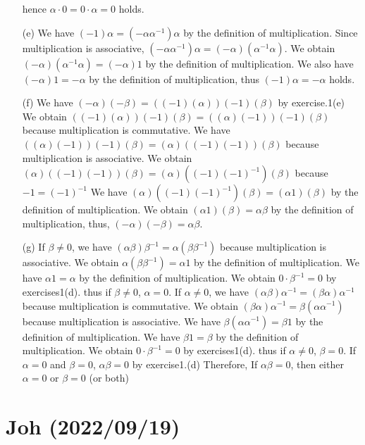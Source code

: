 \documentclass{article}
\begin{document}
\begin{itemize}
    hence $\alpha\cdot0 = 0\cdot\alpha = 0$ holds.
  \item[(e)]We have $(-1)\alpha = (-\alpha\alpha^{-1})\alpha$ by the definition of multiplication.
    Since multiplication is associative, $(-\alpha\alpha^{-1})\alpha = (-\alpha)(\alpha^{-1}\alpha)$.
    We obtain $(-\alpha)(\alpha^{-1}\alpha) = (-\alpha)1$ by the definition of multiplication.
    We also have $(-\alpha)1 = -\alpha$ by the definition of multiplication, 
    thus $(-1)\alpha = -\alpha$ holds.
  \item[(f)]We have $(-\alpha)(-\beta) = ((-1)(\alpha))(-1)(\beta)$ by exercise.1(e)
    We obtain $((-1)(\alpha))(-1)(\beta) = ((\alpha)(-1))(-1)(\beta)$ because multiplication is commutative.
    We have $((\alpha)(-1))(-1)(\beta) = (\alpha)((-1)(-1))(\beta)$ because multiplication is associative.
    We obtain $(\alpha)((-1)(-1))(\beta) = (\alpha)((-1)(-1)^{-1})(\beta)$ because $-1 = (-1)^{-1}$
    We have $(\alpha)((-1)(-1)^{-1})(\beta) = (\alpha1)(\beta)$ by the definition of multiplication.
    We obtain $(\alpha1)(\beta) = \alpha\beta$ by the definition of multiplication,
    thus, $(-\alpha)(-\beta) = \alpha\beta$.
  \item[(g)]If $\beta \neq 0$, we have $(\alpha\beta)\beta^{-1}=\alpha(\beta\beta^{-1})$ because multiplication is associative.
    We obtain $\alpha(\beta\beta^{-1}) = \alpha1$ by the definition of multiplication.
    We have $\alpha1 = \alpha$ by the definition of multiplication.
    We obtain $0\cdot\beta^{-1} = 0$ by exercises1(d).
    thus if $\beta \neq 0$, $\alpha = 0$.
    If $\alpha \neq 0$, we have $(\alpha\beta)\alpha^{-1} = (\beta\alpha)\alpha^{-1}$ because multiplication is commutative.
    We obtain $(\beta\alpha)\alpha^{-1} = \beta(\alpha\alpha^{-1})$ because multiplication is associative.
    We have $\beta(\alpha\alpha^{-1}) = \beta1$  by the definition of multiplication.
    We have $\beta1 = \beta$ by the definition of multiplication.
    We obtain $0\cdot\beta^{-1} = 0$ by exercises1(d).
    thus if $\alpha \neq 0$, $\beta = 0$.
    If $\alpha = 0$ and $\beta = 0$, $\alpha\beta = 0$ by exercise1.(d)
    Therefore, If $\alpha\beta = 0$, then either $\alpha = 0$ or $\beta = 0$ (or both)
\end{itemize}
\section{Joh (2022/09/19)}
\end{document}
